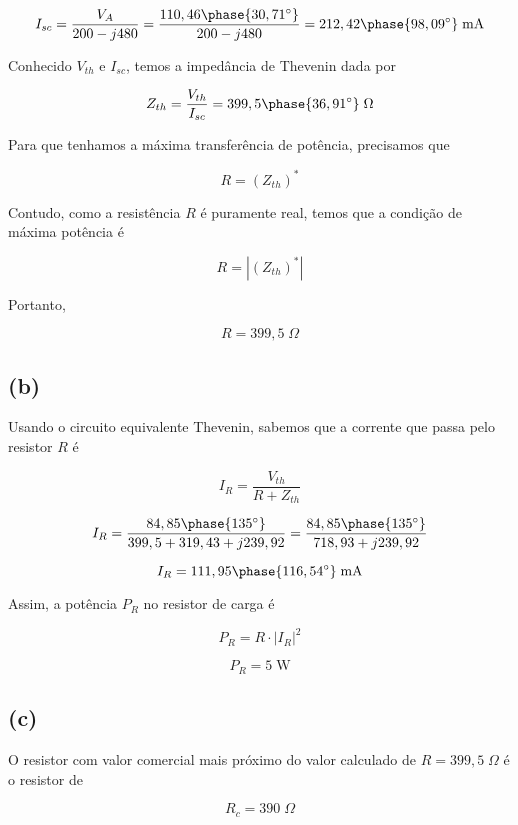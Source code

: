 \[ I_{sc} = \frac{V_A}{200 - j480} = \frac{110,46\phase{30,71^{\circ}}}{200 - j480} = 212,42\phase{98,09^{\circ}}\;\textrm{mA} \]

Conhecido $V_{th}$ e $I_{sc}$, temos a impedância de Thevenin dada por

\[ Z_{th} = \frac{V_{th}}{I_{sc}} = 399,5\phase{36,91^{\circ}} \;\Omega \]

Para que tenhamos a máxima transferência de potência, precisamos que

\[ R = (Z_{th})^* \]

Contudo, como a resistência $R$ é puramente real, temos que a condição de máxima potência é

\[ R = |(Z_{th})^*| \]

Portanto, 

\[ \boxed{R = 399,5 \;\Omega} \]

\subsection*{(b)}

Usando o circuito equivalente Thevenin, sabemos que a corrente que passa pelo resistor $R$ é

\[ I_R = \frac{V_{th}}{R + Z_{th}} \]

\[ I_R = \frac{84,85\phase{135^{\circ}}}{399,5 + 319,43 + j239,92} = \frac{84,85\phase{135^{\circ}}}{718,93 + j239,92} \]

\[ I_R = 111,95\phase{116,54^{\circ}} \;\textrm{mA} \]

Assim, a potência $P_R$ no resistor de carga é

\[ P_R = R \cdot |I_{R}|^2 \]

\[ \boxed{P_R = 5 \;\textrm{W}} \]

\subsection*{(c)}

O resistor com valor comercial mais próximo do valor calculado de $R = 399,5 \;\Omega$ é o resistor de

\[ \boxed{R_c = 390 \;\Omega} \]



